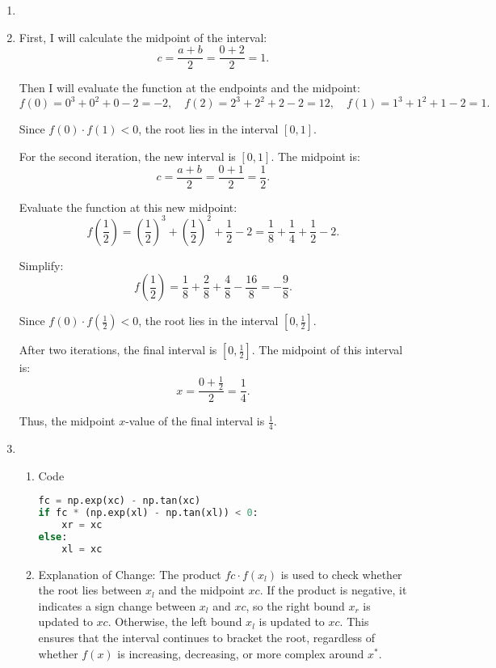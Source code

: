\documentclass[12pt]{article}
\begin{document}
\begin{enumerate}
\item {}

\item 

First, I will calculate the midpoint of the interval:
\[
c = \frac{a + b}{2} = \frac{0 + 2}{2} = 1.
\]

Then I will evaluate the function at the endpoints and the midpoint:
\[
f(0) = 0^3 + 0^2 + 0 - 2 = -2, \quad f(2) = 2^3 + 2^2 + 2 - 2 = 12, \quad f(1) = 1^3 + 1^2 + 1 - 2 = 1.
\]

Since \( f(0) \cdot f(1) < 0 \), the root lies in the interval \([0, 1]\).

For the second iteration, the new interval is \([0, 1]\). The midpoint is:
\[
c = \frac{a + b}{2} = \frac{0 + 1}{2} = \frac{1}{2}.
\]

Evaluate the function at this new midpoint:
\[
f\left(\frac{1}{2}\right) = \left(\frac{1}{2}\right)^3 + \left(\frac{1}{2}\right)^2 + \frac{1}{2} - 2 = \frac{1}{8} + \frac{1}{4} + \frac{1}{2} - 2.
\]

Simplify:
\[
f\left(\frac{1}{2}\right) = \frac{1}{8} + \frac{2}{8} + \frac{4}{8} - \frac{16}{8} = -\frac{9}{8}.
\]

Since \( f(0) \cdot f\left(\frac{1}{2}\right) < 0 \), the root lies in the interval \([0, \frac{1}{2}]\).

After two iterations, the final interval is \([0, \frac{1}{2}]\). The midpoint of this interval is:
\[
x = \frac{0 + \frac{1}{2}}{2} = \frac{1}{4}.
\]

Thus, the midpoint \(x\)-value of the final interval is \( \frac{1}{4} \).

\item 

\begin{enumerate}
    \item Code
    \begin{lstlisting}[language=Python, frame=single]
fc = np.exp(xc) - np.tan(xc)
if fc * (np.exp(xl) - np.tan(xl)) < 0: 
    xr = xc
else: 
    xl = xc
    \end{lstlisting}

    \item Explanation of Change:
    The product \( fc \cdot f(x_l) \) is used to check whether the root lies between \( x_l \) and the midpoint \( xc \). If the product is negative, it indicates a sign change between \( x_l \) and \( xc \), so the right bound \( x_r \) is updated to \( xc \). Otherwise, the left bound \( x_l \) is updated to \( xc \). This ensures that the interval continues to bracket the root, regardless of whether \( f(x) \) is increasing, decreasing, or more complex around \( x^* \).


\end{enumerate}
\end{enumerate}
\end{document}
